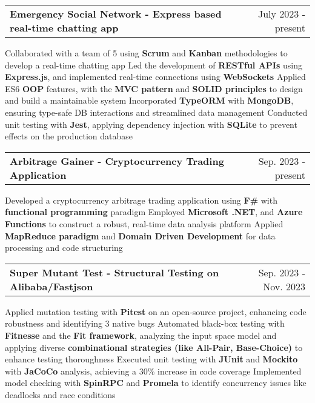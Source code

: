 \newcommand{\resumeProjEntry}[2]{
    \vspace{5pt}\item
      \begin{tabular*}{0.97\textwidth}{l@{\extracolsep{\fill}}r}
        \textbf{#1} & \small #2\\
      \end{tabular*}\vspace{-5pt}
}

\resumeProjEntry
{Emergency Social Network - Express based real-time chatting app}
{July 2023 - present}
{
    \resumeItemListStart
        \resumeItem
        {Collaborated with a team of 5 using \textbf{Scrum} and \textbf{Kanban} methodologies to develop a real-time chatting app}
        \resumeItem
        {Led the development of \textbf{RESTful APIs} using \textbf{Express.js}, and implemented real-time connections using \textbf{WebSockets}}
        \resumeItem
        {Applied ES6 \textbf{OOP} features, with the \textbf{MVC pattern} and \textbf{SOLID principles} to design and build a maintainable system}
        \resumeItem
        {Incorporated \textbf{TypeORM} with \textbf{MongoDB}, ensuring type-safe DB interactions and streamlined data management}
        \resumeItem
        {Conducted unit testing with \textbf{Jest}, applying dependency injection with \textbf{SQLite} to prevent effects on the production database}
    \resumeItemListEnd
}

\resumeProjEntry
{Arbitrage Gainer - Cryptocurrency Trading Application}
{Sep. 2023 - present}
{
    \resumeItemListStart
        \resumeItem
        {Developed a cryptocurrency arbitrage trading application using \textbf{F\#} with \textbf{functional programming} paradigm}
        \resumeItem
        {Employed \textbf{Microsoft .NET}, and \textbf{Azure Functions} to construct a robust, real-time data analysis platform}
        \resumeItem
        {Applied \textbf{MapReduce paradigm} and \textbf{Domain Driven Development} for data processing and code structuring}
    \resumeItemListEnd
}

\resumeProjEntry
{Super Mutant Test - Structural Testing on Alibaba/Fastjson}
{Sep. 2023 - Nov. 2023}
{
    \resumeItemListStart
        \resumeItem
        {Applied mutation testing with \textbf{Pitest} on an open-source project, enhancing code robustness and identifying 3 native bugs}
        \resumeItem
        {Automated black-box testing with \textbf{Fitnesse} and the \textbf{Fit framework}, analyzing the input space model and applying diverse \textbf{combinational strategies (like All-Pair, Base-Choice)} to enhance testing thoroughness}
        \resumeItem
        {Executed unit testing with \textbf{JUnit} and \textbf{Mockito} with \textbf{JaCoCo} analysis, achieving a 30\% increase in code coverage}
        \resumeItem
        {Implemented model checking with \textbf{SpinRPC} and \textbf{Promela} to identify concurrency issues like deadlocks and race conditions}
    \resumeItemListEnd

}


